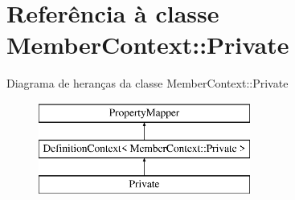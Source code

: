\hypertarget{class_member_context_1_1_private}{\section{Referência à classe Member\-Context\-:\-:Private}
\label{class_member_context_1_1_private}
}
Diagrama de heranças da classe Member\-Context\-:\-:Private\begin{figure}[H]
\begin{center}
\leavevmode
\includegraphics[height=3.000000cm]{class_member_context_1_1_private}
\end{center}
\end{figure}
